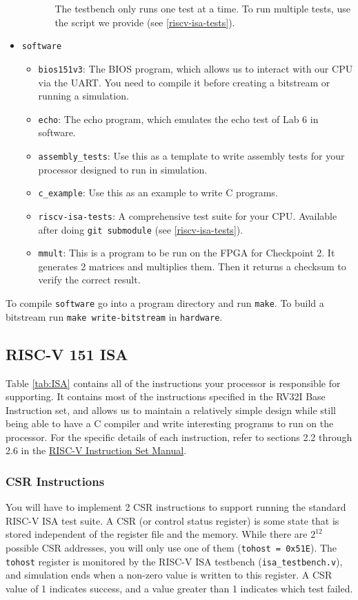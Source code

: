 \documentclass[11pt]{article}
\begin{document}
\begin{itemize}
\begin{itemize}
\begin{itemize}
The testbench only runs one test at a time. To run multiple tests, use the script we provide (see \ref{riscv-isa-tests}).
        \end{itemize}
    \end{itemize}
  \item \texttt{software}
    \begin{itemize}
      \item \verb|bios151v3|: The BIOS program, which allows us to interact with our CPU via the UART. You need to compile it before creating a bitstream or running a simulation.
      \item \verb|echo|: The echo program, which emulates the echo test of Lab 6 in software.
      \item \verb|assembly_tests|: Use this as a template to write assembly tests for your processor designed to run in simulation.
      \item \verb|c_example|: Use this as an example to write C programs.
      \item \verb|riscv-isa-tests|: A comprehensive test suite for your CPU. Available after doing \verb|git submodule| (see \ref{riscv-isa-tests}).
      \item \verb|mmult|: This is a program to be run on the FPGA for Checkpoint 2. It generates 2 matrices and multiplies them. Then it returns a checksum to verify the correct result.
    \end{itemize}
\end{itemize}

To compile \texttt{software} go into a program directory and run \texttt{make}.
To build a bitstream run \texttt{make write-bitstream} in \texttt{hardware}.

\subsection{RISC-V 151 ISA}
Table \ref{tab:ISA} contains all of the instructions your processor is responsible for supporting.
It contains most of the instructions specified in the RV32I Base Instruction set, and allows us to maintain a relatively simple design while still being able to have a C compiler and write interesting programs to run on the processor.
For the specific details of each instruction, refer to sections 2.2 through 2.6 in the \href{http://riscv.org/specifications/}{RISC-V Instruction Set Manual}.

\subsubsection{CSR Instructions}
You will have to implement 2 CSR instructions to support running the standard RISC-V ISA test suite.
A CSR (or control status register) is some state that is stored independent of the register file and the memory.
While there are $2^{12}$ possible CSR addresses, you will only use one of them (\texttt{tohost = 0x51E}).
The \texttt{tohost} register is monitored by the RISC-V ISA testbench (\verb|isa_testbench.v|), and simulation ends when a non-zero value is written to this register.
A CSR value of 1 indicates success, and a value greater than 1 indicates which test failed.
\end{document}

